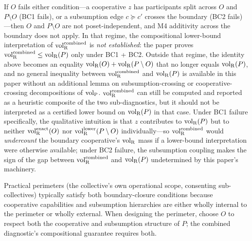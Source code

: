 \begin{remark}
\label{rem:boundary_cooperative_undercount}
If $O$ fails either condition---a cooperative $z$ has
participants split across $O$ and $P \setminus O$ (BC1 fails),
or a subsumption edge $c \succeq c'$ crosses the boundary (BC2
fails)---then $O$ and $P \setminus O$ are not poset-independent,
and M4 additivity across the boundary does not apply.  In that
regime, the compositional lower-bound interpretation of
${\operatorname{vol}_{\mathrm{R}}^{\mathrm{combined}}}$ is \emph{not established}: the paper proves
${\operatorname{vol}_{\mathrm{R}}^{\mathrm{combined}}} \leq {\operatorname{vol}_{\mathrm{R}}}(P)$ only under BC1 + BC2.  Outside that
regime, the identity above becomes an equality ${\operatorname{vol}_{\mathrm{R}}}(O) +
{\operatorname{vol}_{\mathrm{R}}}(P \setminus O)$ that no longer equals ${\operatorname{vol}_{\mathrm{R}}}(P)$, and no
general inequality between ${\operatorname{vol}_{\mathrm{R}}^{\mathrm{combined}}}$ and ${\operatorname{vol}_{\mathrm{R}}}(P)$ is
available in this paper without an additional lemma on
subsumption-crossing or cooperative-crossing decompositions of
${\operatorname{vol}_{\mathrm{P}}}$.  ${\operatorname{vol}_{\mathrm{R}}^{\mathrm{combined}}}$ can still be computed and reported as a
heuristic composite of the two sub-diagnostics, but it should
not be interpreted as a certified lower bound on ${\operatorname{vol}_{\mathrm{R}}}(P)$ in
that case.  Under BC1 failure specifically, the qualitative
intuition is that $z$ contributes to ${\operatorname{vol}_{\mathrm{R}}}(P)$ but to neither
${\operatorname{vol}_{\mathrm{R}}^{\mathrm{exact}}}(O)$ nor ${\operatorname{vol}_{\mathrm{R}}^{\mathrm{lower}}}(P \setminus O)$ individually---so
${\operatorname{vol}_{\mathrm{R}}^{\mathrm{combined}}}$ would \emph{undercount} the boundary cooperative's
${\operatorname{vol}_{\mathrm{R}}}$ mass if a lower-bound interpretation were otherwise
available; under BC2 failure, the subsumption coupling makes the
sign of the gap between ${\operatorname{vol}_{\mathrm{R}}^{\mathrm{combined}}}$ and ${\operatorname{vol}_{\mathrm{R}}}(P)$ undetermined
by this paper's machinery.

Practical perimeters (the collective's own operational scope,
consenting sub-collectives) typically satisfy both
boundary-closure conditions because cooperative capabilities
and subsumption hierarchies are either wholly internal to the
perimeter or wholly external.  When designing the perimeter,
choose $O$ to respect both the cooperative and subsumption
structure of $P$; the combined diagnostic's compositional
guarantee requires both.
\end{remark}
